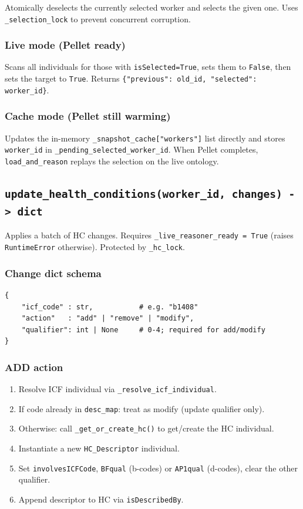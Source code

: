 ﻿\documentclass[12pt,a4paper]{article}
\begin{document}
Atomically deselects the currently selected worker and selects the given one. Uses \texttt{\_selection\_lock} to prevent concurrent corruption.

\subsubsection*{Live mode (Pellet ready)}
Scans all individuals for those with \texttt{isSelected=True}, sets them to \texttt{False}, then sets the target to \texttt{True}. Returns \texttt{\{"previous": old\_id, "selected": worker\_id\}}.

\subsubsection*{Cache mode (Pellet still warming)}
Updates the in-memory \texttt{\_snapshot\_cache["workers"]} list directly and stores \texttt{worker\_id} in \texttt{\_pending\_selected\_worker\_id}. When Pellet completes, \texttt{load\_and\_reason} replays the selection on the live ontology.

\subsection{\texttt{update\_health\_conditions(worker\_id, changes) -> dict}}

Applies a batch of HC changes. Requires \texttt{\_live\_reasoner\_ready = True} (raises \texttt{RuntimeError} otherwise). Protected by \texttt{\_hc\_lock}.

\subsubsection*{Change dict schema}
\begin{lstlisting}
{
    "icf_code" : str,           # e.g. "b1408"
    "action"   : "add" | "remove" | "modify",
    "qualifier": int | None     # 0-4; required for add/modify
}
\end{lstlisting}

\subsubsection*{ADD action}
\begin{enumerate}[noitemsep]
  \item Resolve ICF individual via \texttt{\_resolve\_icf\_individual}.
  \item If code already in \texttt{desc\_map}: treat as modify (update qualifier only).
  \item Otherwise: call \texttt{\_get\_or\_create\_hc()} to get/create the HC individual.
  \item Instantiate a new \texttt{HC\_Descriptor} individual.
  \item Set \texttt{involvesICFCode}, \texttt{BFqual} (b-codes) or \texttt{AP1qual} (d-codes), clear the other qualifier.
  \item Append descriptor to HC via \texttt{isDescribedBy}.
\end{enumerate}
\end{document}
